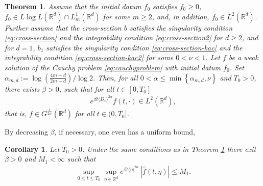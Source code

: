 \documentclass[11pt,a4paper,reqno]{amsart}
\theoremstyle{plain}
\newtheorem{corollary}[proposition]{Corollary}
\newtheorem{theorem}[proposition]{Theorem}
\theoremstyle{definition}
\begin{document}
\begin{theorem}\label{thm:gevrey1}
	Assume that the initial datum $f_0$ satisfies $f_0\geq 0$, $f_0 \in L\log L({\mathbb{R}}^d) \cap L^1_{m}({\mathbb{R}}^d)$ for some $m\geq 2$, and, in addition, $f_0\in L^2({\mathbb{R}}^d)$.
	Further assume that the cross-section $b$ satisfies the \emph{singularity condition} \eqref{eq:cross-section} and the \emph{integrability condition} \eqref{eq:cross-section2} for $d\geq 2$, and for $d=1$, $b_1$ satisfies the \emph{singularity condition} \eqref{eq:cross-section-kac} and the \emph{integrability condition} \eqref{eq:cross-section-kac2} for some $0<\nu<1$. Let $f$ be a weak solution of the Cauchy problem \eqref{eq:cauchyproblem} with initial datum $f_0$. 	Set $\alpha_{m,d}:=\log\left(\frac{4m+d}{2m+d}\right)/\log 2$.
	Then, for all $0<\alpha\leq \min\left\{\alpha_{m,d}, \nu\right\}$ and $T_0>0$, there exists $\beta>0$, such that for all $t\in[0, T_0]$
 	\begin{align}\label{eq:local-time-uniform-1}
		e^{\beta t \langle D_v\rangle^{2\alpha}} f(t,\cdot) \in L^2({\mathbb{R}}^d),
	\end{align}
	that is, $f\in G^{\tfrac{1}{2\alpha}}({\mathbb{R}}^d)$ for all $t\in(0,T_0]$.
\end{theorem}
By decreasing $\beta$, if necessary, one even has a uniform bound,
\begin{corollary}\label{cor:gevrey1}
		Let $T_0>0$. Under the same conditions as in Theorem \ref{thm:gevrey1} there exit  $\beta>0$ and $M_1<\infty$ such that
	\begin{align}\label{eq:cor-gevrey1}
		\sup_{0\le t\le T_0}\sup_{\eta\in{\mathbb{R}}^d} e^{ \beta t \langle \eta \rangle^{2\alpha}} \, |\hat{f}(t,\eta)| \le M_1 .
	\end{align}
\end{corollary}
\end{document}
